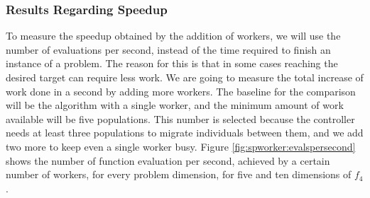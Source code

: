\documentclass[review]{elsarticle}
\begin{document}
\subsubsection{Results Regarding Speedup}
\label{sec:speedup}

To measure the speedup obtained by the addition of workers, we will use the
number of evaluations per second, instead of the time required to finish an
instance of a problem. The reason for this is that in some cases reaching the
desired target can require less work. We are going to measure the total increase
of work done in a second by adding more workers. The baseline for the comparison
will be the algorithm with a single worker, and the minimum amount of work available will be five
populations. This number is selected because the controller needs at least
three populations to migrate individuals between them, and we add two more to
keep even a single worker busy. Figure \ref{fig:spworker:evalspersecond} 
shows the number of function evaluation per second, achieved by a certain number of
workers, for every problem dimension, for five and ten dimensions of $f_4$.  
\end{document}
